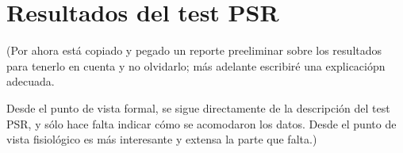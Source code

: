 \section{Resultados del test PSR}

(Por ahora est\'a copiado y pegado un reporte preeliminar sobre los resultados
para tenerlo en cuenta y no olvidarlo; m\'as adelante
escribir\'e una explicaci\'opn adecuada.

Desde el punto de vista formal, se sigue directamente de la descripci\'on del test PSR, y s\'olo
hace falta indicar c\'omo se acomodaron los datos. Desde el punto de vista fisiol\'ogico es m\'as
interesante y extensa la parte que falta.)



